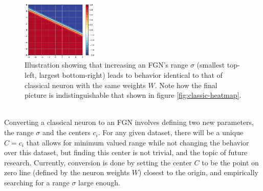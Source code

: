 \documentclass[12pt,oneside]{CUNY_PhD}
\begin{document}
\begin{figure}[!htbp]
    \includegraphics[width=0.32\textwidth]{images/Matching-behavior/sigma-7-cropped.png}
    \caption{Illustration showing that increasing an FGN's range $\sigma$ (smallest top-left, largest bottom-right) leads to behavior identical to that of classical neuron with the same weights $W$. Note how the final picture is indistinguishable that shown in figure \ref{fig:classic-heatmap}. }
    \label{fig:matching}
\end{figure}\\
Converting a classical neuron to an FGN involves defining two new parameters, the range $\sigma$ and the centers $c_i$. For any given dataset, there will be a unique $C=c_i$ that allows for minimum valued range while not changing the behavior over this dataset, but finding this center is not trivial, and the topic of future research. Currently, conversion is done by setting the center $C$ to be the point on zero line (defined by the neuron weights $W$) closest to the origin, and empirically searching for a range $\sigma$ large enough.
\end{document}
